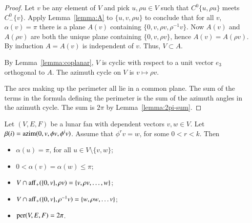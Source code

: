 \begin{proof}  Let $v$ be any element of  $V$ and pick $u,\rho u\in V$ such that $C^0\{u,\rho u\}$ meets $C^0_-\{v\}$.  Apply
Lemma~\ref{lemma:A} to $\{u,v,\rho u\}$ to conclude that for all $v$, $\alpha(v)=\pi$ there is a plane $A(v)$ containing
$\{0,v,\rho v,\rho^{-1} v\}$.   Now $A(v)$ and $A(\rho v)$ are both the unique plane containing $\{0,v,\rho v\}$, hence $A(v) = A(\rho v)$.  By induction $A=A(v)$ is independent of $v$.  Thus, $V\subset A$.


By Lemma~\ref{lemma:coplanar}, $V$ is cyclic with respect to a unit vector $e_3$ orthogonal to $A$.  The
azimuth cycle on $V$ is $v \mapsto \rho v$.
%

The arcs making up the perimeter all lie in a common plane.   The sum of the terms in the formula defining the perimeter is the sum of the azimuth angles in the azimuth cycle.  The sum is $2\pi$ by Lemma~\ref{lemma:2pi-sum}.
\end{proof}

\begin{lemma}\label{lemma:lunar}
Let $(V,E,F)$ be a lunar fan with dependent vectors $v,w\in V$.  
Let $\beta(i) = {\operatorname{azim}}(0,v,\phi v,\phi^i v)$.  Assume that $\phi^r v = w$, for
some $0< r < k$.
Then
\begin{itemize}
\item $\alpha(u) = \pi$, for all $u\in V\setminus \{v,w\}$; \vspace{3pt}
\item $0< \alpha(v) = \alpha(w)\le \pi$; \vspace{3pt}
\item $V\cap {\operatorname{aff}}_+(\{0,v\},\rho v) = \{v,\rho v,\ldots, w\}$; \vspace{3pt}
\item $V \cap {\operatorname{aff}}_+(\{0,v\},\rho^{-1} v) = \{w,\rho w,\ldots v\}$;  \vspace{3pt}
\item ${\operatorname{per}}(V,E,F) = 2\pi$.
\end{itemize}
\end{lemma}

